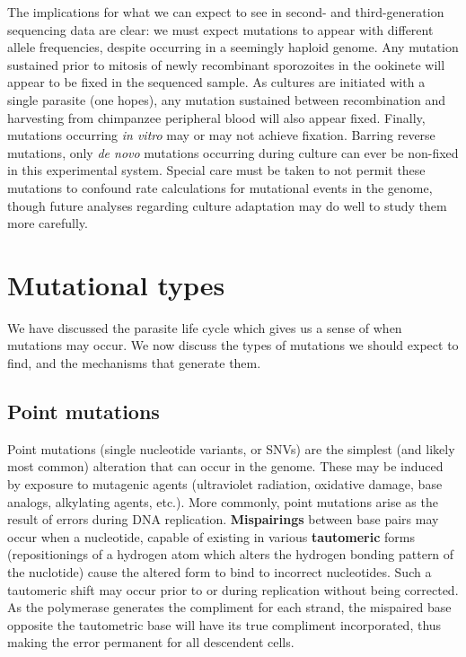 The implications for what we can expect to see in second- and third-generation sequencing data are clear: we must expect mutations to appear with different allele frequencies, despite occurring in a seemingly haploid genome.  Any mutation sustained prior to mitosis of newly recombinant sporozoites in the ookinete will appear to be fixed in the sequenced sample.  As cultures are initiated with a single parasite (one hopes), any mutation sustained between recombination and harvesting from chimpanzee peripheral blood will also appear fixed.  Finally, mutations occurring \textit{in vitro} may or may not achieve fixation.  Barring reverse mutations, only \textit{de novo} mutations occurring during culture can ever be non-fixed in this experimental system.  Special care must be taken to not permit these mutations to confound rate calculations for mutational events in the genome, though future analyses regarding culture adaptation may do well to study them more carefully.

\section{Mutational types}

We have discussed the parasite life cycle which gives us a sense of when mutations may occur.  We now discuss the types of mutations we should expect to find, and the mechanisms that generate them.

\subsection{Point mutations}

Point mutations (single nucleotide variants, or SNVs) are the simplest (and likely most common) alteration that can occur in the genome.  These may be induced by exposure to mutagenic agents (ultraviolet radiation, oxidative damage, base analogs, alkylating agents, etc.).  More commonly, point mutations arise as the result of errors during DNA replication.  \textbf{Mispairings} between base pairs may occur when a nucleotide, capable of existing in various \textbf{tautomeric} forms (repositionings of a hydrogen atom which alters the hydrogen bonding pattern of the nuclotide) cause the altered form to bind to incorrect nucleotides.  Such a tautomeric shift may occur prior to or during replication without being corrected.  As the polymerase generates the compliment for each strand, the mispaired base opposite the tautometric base will have its true compliment incorporated, thus making the error permanent for all descendent cells\cite{Griffiths:2003wb}.

